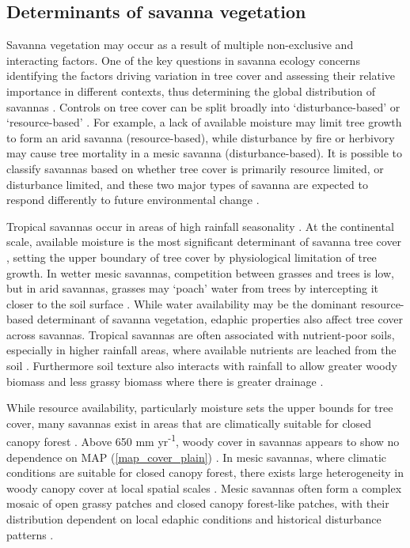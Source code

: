 \begin{refsection}
\subsection{Determinants of savanna vegetation}

Savanna vegetation may occur as a result of multiple non-exclusive and interacting factors. One of the key questions in savanna ecology concerns identifying the factors driving variation in tree cover and assessing their relative importance in different contexts, thus determining the global distribution of savannas \citep{Higgins2000, Archibald2019}. Controls on tree cover can be split broadly into `disturbance-based' or `resource-based' \citep{Bond2008, Staver2015}. For example, a lack of available moisture may limit tree growth to form an arid savanna (resource-based), while disturbance by fire or herbivory may cause tree mortality in a mesic savanna (disturbance-based). It is possible to classify savannas based on whether tree cover is primarily resource limited, or disturbance limited, and these two major types of savanna are expected to respond differently to future environmental change \citep{Torello2013}. 

Tropical savannas occur in areas of high rainfall seasonality \citep{Lehmann2011}. At the continental scale, available moisture is the most significant determinant of savanna tree cover \citep{Sankaran2005}, setting the upper boundary of tree cover by physiological limitation of tree growth. In wetter mesic savannas, competition between grasses and trees is low, but in arid savannas, grasses may `poach' water from trees by intercepting it closer to the soil surface \citep{Scheiter2007}. While water availability may be the dominant resource-based determinant of savanna vegetation, edaphic properties also affect tree cover across savannas. Tropical savannas are often associated with nutrient-poor soils, especially in higher rainfall areas, where available nutrients are leached from the soil \citep{February2013}. Furthermore soil texture also interacts with rainfall to allow greater woody biomass and less grassy biomass where there is greater drainage \citep{Staver2011}. 

While resource availability, particularly moisture sets the upper bounds for tree cover, many savannas exist in areas that are climatically suitable for closed canopy forest \citep{Sankaran2005, Lehmann2011, Staver2011, Murphy2012}. Above \textapprox{}650 mm yr\textsuperscript{-1}, woody cover in savannas appears to show no dependence on MAP (\autoref{map_cover_plain}) \citep{Sankaran2008, Sankaran2005, Good2011}. In mesic savannas, where climatic conditions are suitable for closed canopy forest, there exists large heterogeneity in woody canopy cover at local spatial scales \citep{Dantas2015}. Mesic savannas often form a complex mosaic of open grassy patches and closed canopy forest-like patches, with their distribution dependent on local edaphic conditions and historical disturbance patterns \citep{Staver2011}. 


\end{refsection}
